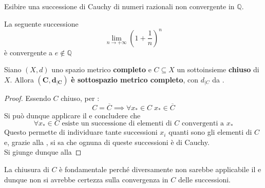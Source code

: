 \begin{exercise}
	Esibire una successione di Cauchy di numeri razionali non convergente in $\mathbb{Q}$.
	\begin{solution}
		La seguente successione
		\[\lim\limits_{n \to +\infty} \left( 1+ \frac{1}{n} \right)^n\]
		è convergente a $e \notin \mathbb{Q}$
	\end{solution}
\end{exercise}
\begin{proposition}
	\label{prop:subset_compl_e_compl}
	Siano $(X,d)$ uno spazio metrico \textbf{completo} e $C \subseteq X$ un sottoinsieme \textbf{chiuso} di $X$. Allora $\boldsymbol{(C,d_{|C})}$ \textbf{è sottospazio metrico completo}, con $d_{|C}$ da .
	\begin{proof}
		Essendo $C$ chiuso, per :
		\[C = \overline{C} \implies \forall x_* \in C\; x_* \in \overline{C}\]
		Si può dunque applicare il  e concludere che
		\[\forall x_* \in C \text{ esiste un successione di elementi di $C$ convergenti a $x_*$}\]
		Questo permette di individuare tante successioni $x_i$ quanti sono gli elementi di $C$ e, grazie alla , si sa che ognuna di queste successioni è di Cauchy.\\
		Si giunge dunque alla 
	\end{proof}
	\begin{note}
		La chiusura di $C$ è fondamentale perché diversamente non sarebbe applicabile il  e dunque non si avrebbe certezza sulla convergenza in $C$ delle successioni.
	\end{note}
\end{proposition}
